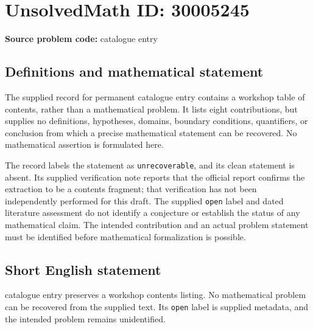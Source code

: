 \documentclass[11pt]{article}
\begin{document}
\section*{UnsolvedMath ID: 30005245}
\textbf{Source problem code:} catalogue entry
\subsection{Definitions and mathematical statement}
The supplied record for permanent catalogue entry contains a workshop table of contents, rather than a mathematical problem. It lists eight contributions, but supplies no definitions, hypotheses, domains, boundary conditions, quantifiers, or conclusion from which a precise mathematical statement can be recovered. No mathematical assertion is formulated here.

The record labels the statement as \texttt{unrecoverable}, and its clean statement is absent. Its supplied verification note reports that the official report confirms the extraction to be a contents fragment; that verification has not been independently performed for this draft. The supplied \texttt{open} label and dated literature assessment do not identify a conjecture or establish the status of any mathematical claim. The intended contribution and an actual problem statement must be identified before mathematical formalization is possible.
\subsection{Short English statement}
catalogue entry preserves a workshop contents listing. No mathematical problem can be recovered from the supplied text. Its \texttt{open} label is supplied metadata, and the intended problem remains unidentified.
\end{document}
